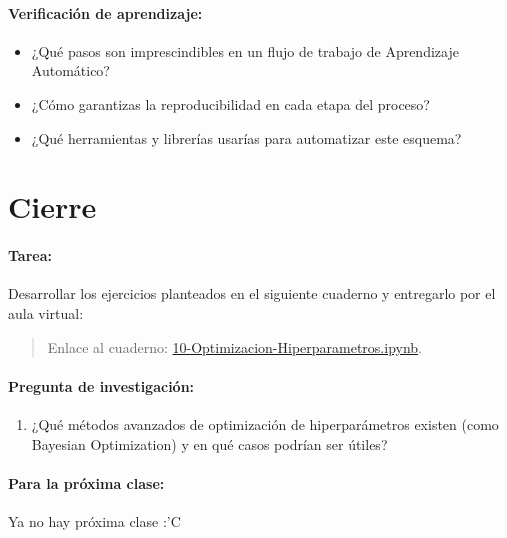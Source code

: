\documentclass[a4,11pt]{aleph-notas}
\begin{document}
\paragraph{Verificación de aprendizaje:}  
\begin{itemize}[leftmargin=*]
    \item ¿Qué pasos son imprescindibles en un flujo de trabajo de Aprendizaje Automático?
    \item ¿Cómo garantizas la reproducibilidad en cada etapa del proceso?
    \item ¿Qué herramientas y librerías usarías para automatizar este esquema?
\end{itemize}



\section*{Cierre}

\paragraph{Tarea:}
    Desarrollar los ejercicios planteados en el siguiente cuaderno y entregarlo por el aula virtual:
    \begin{quote}
        Enlace al cuaderno: \href{https://colab.research.google.com/github/andres-merino/AprendizajeAutomaticoInicial-05-N0105/blob/main/2-Ejercicios/10-Optimizacion-Hiperparametros.ipynb}{10-Optimizacion-Hiperparametros.ipynb}.
    \end{quote}

\paragraph{Pregunta de investigación:}  
\begin{enumerate}[leftmargin=*]
    \item ¿Qué métodos avanzados de optimización de hiperparámetros existen (como Bayesian Optimization) y en qué casos podrían ser útiles?
\end{enumerate}
    
\paragraph{Para la próxima clase:}  
Ya no hay próxima clase :'C
\end{document}
